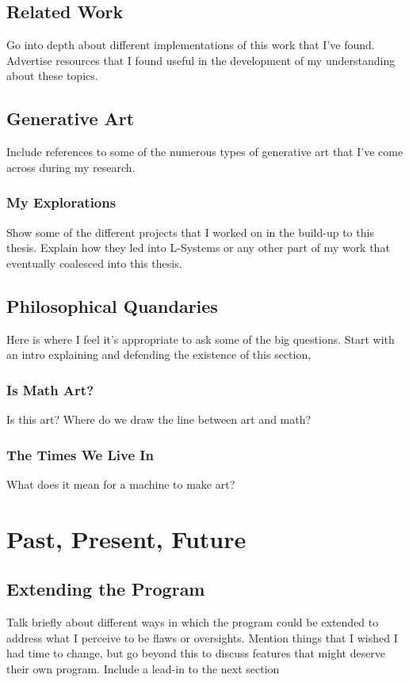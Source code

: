 \documentclass[12pt,twoside]{reedthesis}
\begin{document}
\section{Related Work}
Go into depth about different implementations of this work that I've found. Advertise resources that I found useful in the development of my understanding about these topics.
\section{Generative Art}
Include references to some of the numerous types of generative art that I've come across during my research. 
\subsection{My Explorations}
Show some of the different projects that I worked on in the build-up to this thesis. Explain how they led into L-Systems or any other part of my work that eventually coalesced into this thesis.

\section{Philosophical Quandaries}
Here is where I feel it's appropriate to ask some of the big questions. Start with an intro explaining and defending the existence of this section, 
\subsection{Is Math Art?}
Is this art? Where do we draw the line between art and math?
\subsection{The Times We Live In}
What does it mean for a machine to make art?



\chapter{Past, Present, Future}
\section{Extending the Program}
Talk briefly about different ways in which the program could be extended to address what I perceive to be flaws or oversights. Mention things that I wished I had time to change, but go beyond this to discuss features that might deserve their own program. Include a lead-in to the next section
\end{document}

